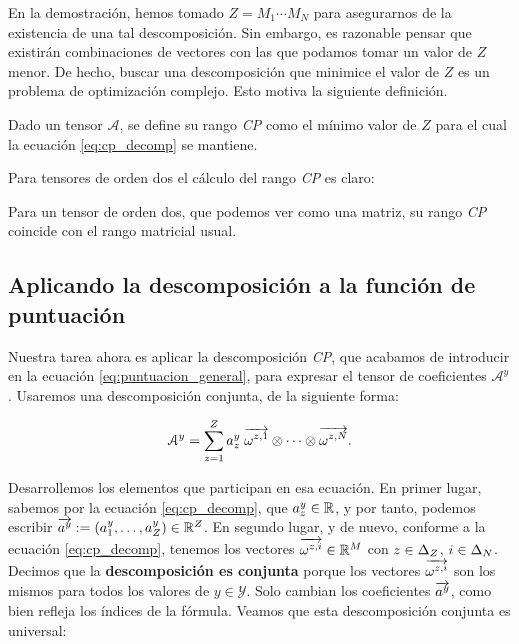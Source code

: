 \begin{observacion}

	En la demostración, hemos tomado $Z = M_1 \cdots M_N$ para asegurarnos de la existencia de una tal descomposición. Sin embargo, es razonable pensar que existirán combinaciones de vectores con las que podamos tomar un valor de $Z$ menor. De hecho, buscar una descomposición que minimice el valor de $Z$ es un problema de optimización complejo. Esto motiva la siguiente definición.
\end{observacion}

\begin{definicion}
	Dado un tensor $\mathcal{A}$, se define su rango \textit{CP} como el mínimo valor de $Z$ para el cual la ecuación \eqref{eq:cp_decomp} se mantiene.

\end{definicion}

Para tensores de orden dos el cálculo del rango \textit{CP} es claro:

\begin{proposicion}
	Para un tensor de orden dos, que podemos ver como una matriz, su rango \textit{CP} coincide con el rango matricial usual.
\end{proposicion}

\subsection{Aplicando la descomposición a la función de puntuación}

Nuestra tarea ahora es aplicar la descomposición \textit{CP}, que acabamos de introducir en la ecuación \eqref{eq:puntuacion_general}, para expresar el tensor de coeficientes $\mathcal{A}^y$. Usaremos una descomposición conjunta, de la siguiente forma:

\begin{equation} \label{eq:cp_decomp_conjunta}
	\mathcal{A}^y = \sum_{z = 1}^Z a_z^y \; \overrightarrow{\omega^{z, 1}} \otimes \dots \otimes \overrightarrow{\omega^{z, N}}.
\end{equation}

Desarrollemos los elementos que participan en esa ecuación. En primer lugar, sabemos por la ecuación \eqref{eq:cp_decomp}, que $a_z^y \in \mathbb{R}$, y por tanto, podemos escribir $\overrightarrow{a^y} := (a_1^y, \ldots, a_Z^y) \in \mathbb{R}^Z$. En segundo lugar, y de nuevo, conforme a la ecuación \eqref{eq:cp_decomp}, tenemos los vectores $\overrightarrow{\omega^{z, i}} \in \mathbb{R}^M$ con $z \in \Delta_{Z}$, $i \in \Delta_{N}$. Decimos que la \textbf{descomposición es conjunta} porque los vectores $\overrightarrow{\omega^{z, i}}$ son los mismos para todos los valores de $y \in \mathcal{Y}$. Solo cambian los coeficientes $\overrightarrow{a^y}$, como bien refleja los índices de la fórmula. Veamos que esta descomposición conjunta es universal:


